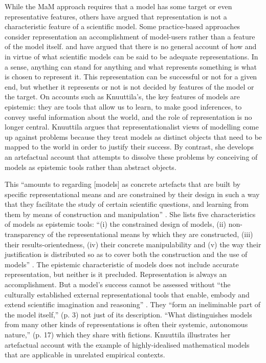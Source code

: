 While the MaM approach requires that a model has some target or even representative features, others have argued  
that representation is not a characteristic feature of a scientific model.
Some practice-based approaches consider representation an accomplishment of model-users rather than a feature of the model itself.
\citet{knuuttila2011,Knuuttila2017} and \citet{teller01} have argued that there is no general account of how and in virtue of what scientific models can be said to be adequate representations. 
In a sense, anything can stand for anything and what represents something is what is chosen to represent it.
This representation can be successful or not for a given end, but whether it represents or not is not decided by features of the model or the target.
On accounts such as Knuuttila's, the key features of models are epistemic: they are tools that allow us to learn, to make good inferences, to convey useful information about the world, and the role of representation is no longer central.
Knuuttila argues that representationalist views of modelling come up against problems because they treat models as distinct objects that need to be mapped to the world in order to justify their success. 
By contrast, she develops an artefactual account that attempts to dissolve these problems by conceiving of models as epistemic tools rather than abstract objects.

This ``amounts to regarding [models] as concrete artefacts that are built by specific representational means and are constrained by their design in such a way that they facilitate the study of certain scientific questions, and learning from them by means of construction and manipulation'' \citep[p.~262]{knuuttila2011}.
She lists five characteristics of models as epistemic tools:
``(i) the constrained design of models, (ii) non-transparency of the representational means by which they are constructed, (iii) their results-orientedness, (iv) their concrete manipulability and (v) the way their justification is distributed so as to cover both the construction and the use of models'' \citep[p.~267]{knuuttila2011}.
The epistemic characteristic of models does not include accurate representation, but neither is it precluded.
Representation is always an accomplishment. 
But a model's success cannot be assessed without ``the culturally established external representational tools that enable, embody and extend scientific imagination and reasoning'' \citep[p.~1]{Knuuttila2017}. 
They ``form an ineliminable part of the model itself,'' (p. 3) not just of its description. 
``What distinguishes models from many other kinds of representations is often their systemic, autonomous nature,'' (p. 17) which they share with fictions.
Knuuttila illustrates her artefactual account with the example of highly-idealised mathematical models that are applicable in unrelated empirical contexts. 


